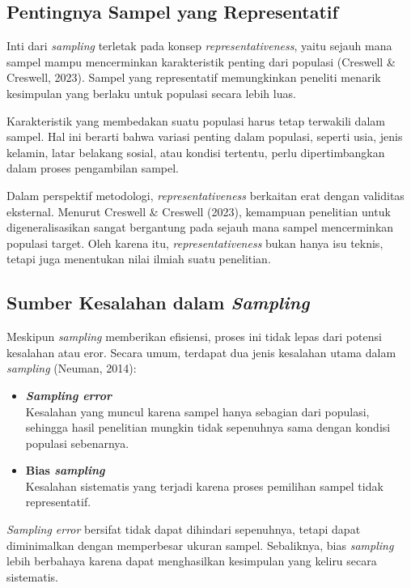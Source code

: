 \documentclass[
  indonesian,
  letterpaper,
  DIV=11,
  numbers=noendperiod]{scrreprt}
\providecommand{\tightlist}{%
  \setlength{\itemsep}{0pt}\setlength{\parskip}{0pt}}
\begin{document}
\subsection{Pentingnya Sampel yang
Representatif}\label{pentingnya-sampel-yang-representatif}

Inti dari \emph{sampling} terletak pada konsep
\emph{representativeness}, yaitu sejauh mana sampel mampu mencerminkan
karakteristik penting dari populasi (Creswell \& Creswell, 2023). Sampel
yang representatif memungkinkan peneliti menarik kesimpulan yang berlaku
untuk populasi secara lebih luas.

Karakteristik yang membedakan suatu populasi harus tetap terwakili dalam
sampel. Hal ini berarti bahwa variasi penting dalam populasi, seperti
usia, jenis kelamin, latar belakang sosial, atau kondisi tertentu, perlu
dipertimbangkan dalam proses pengambilan sampel.

Dalam perspektif metodologi, \emph{representativeness} berkaitan erat
dengan validitas eksternal. Menurut Creswell \& Creswell (2023),
kemampuan penelitian untuk digeneralisasikan sangat bergantung pada
sejauh mana sampel mencerminkan populasi target. Oleh karena itu,
\emph{representativeness} bukan hanya isu teknis, tetapi juga menentukan
nilai ilmiah suatu penelitian.

\subsection{\texorpdfstring{Sumber Kesalahan dalam
\emph{Sampling}}{Sumber Kesalahan dalam Sampling}}\label{sumber-kesalahan-dalam-sampling}

Meskipun \emph{sampling} memberikan efisiensi, proses ini tidak lepas
dari potensi kesalahan atau eror. Secara umum, terdapat dua jenis
kesalahan utama dalam \emph{sampling} (Neuman, 2014):

\begin{itemize}
\tightlist
\item
  \textbf{\emph{Sampling error}}\\
  Kesalahan yang muncul karena sampel hanya sebagian dari populasi,
  sehingga hasil penelitian mungkin tidak sepenuhnya sama dengan kondisi
  populasi sebenarnya.
\item
  \textbf{Bias \emph{sampling}}\\
  Kesalahan sistematis yang terjadi karena proses pemilihan sampel tidak
  representatif.
\end{itemize}

\emph{Sampling error} bersifat tidak dapat dihindari sepenuhnya, tetapi
dapat diminimalkan dengan memperbesar ukuran sampel. Sebaliknya, bias
\emph{sampling} lebih berbahaya karena dapat menghasilkan kesimpulan
yang keliru secara sistematis.
\end{document}
